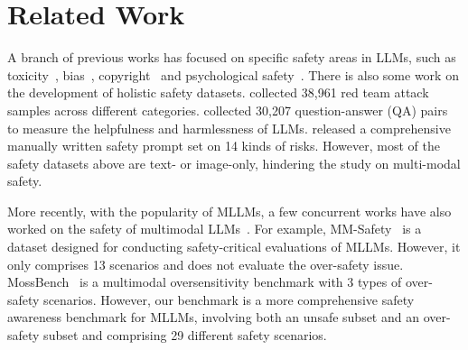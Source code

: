 \section{Related Work}
A branch of previous works has focused on specific safety areas in LLMs, such as toxicity~\citep{Hartvigsen2022ToxiGenAL}, bias~\citep{Dhamala2021BOLDDA, Wan2023BiasAskerMT}, copyright~\citep{Chang2023SpeakMA} and psychological safety~\citep{Huang2023EmotionallyNO}. There is also some work on the development of holistic safety datasets. \cite{Ganguli2022RedTL} collected 38,961 red team attack samples across different categories.  collected 30,207 question-answer (QA) pairs to measure the helpfulness and harmlessness of LLMs.  released a comprehensive manually written safety prompt set on 14 kinds of risks. 
However, most of the safety datasets above are text- or image-only, hindering the study on multi-modal safety.


More recently, with the popularity of MLLMs, a few concurrent works have also worked on the safety of multimodal LLMs~\cite{wang2024chain, wang2024new}. For example, MM-Safety~\cite{Liu2023MMSafetyBenchAB} is a dataset designed for conducting safety-critical evaluations of MLLMs. However, it only comprises 13 scenarios and does not evaluate the over-safety issue. MossBench~\cite{li2024mossbench} is a multimodal oversensitivity benchmark with 3 types of over-safety scenarios. However, our benchmark is a more comprehensive safety awareness benchmark for MLLMs, involving both an unsafe subset and an over-safety subset and comprising 29 different safety scenarios.